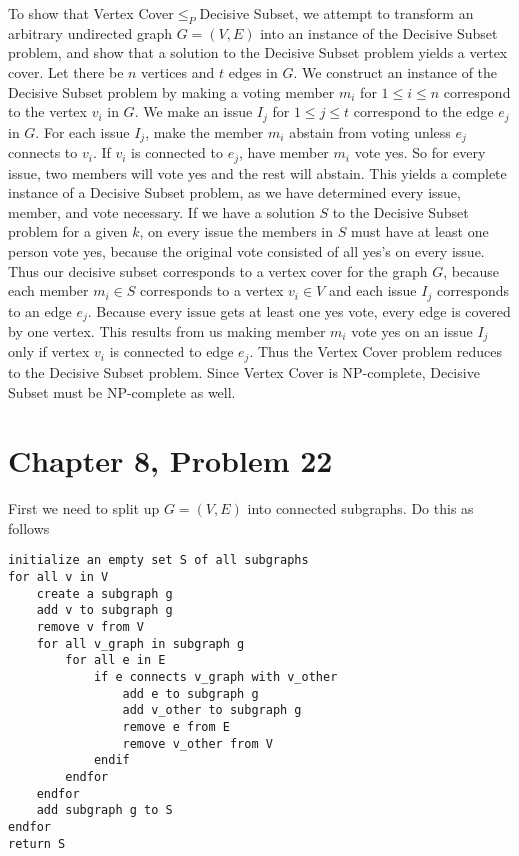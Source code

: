 \documentclass[12pt]{article}
\begin{document}
To show that Vertex Cover\(\leq_P\)Decisive Subset, we attempt to transform an arbitrary undirected graph \(G=(V,E)\) into an instance of the
Decisive Subset problem, and show that a solution to the Decisive Subset problem yields a vertex cover. Let there be \(n\) vertices
and \(t\) edges in \(G\). We construct an instance of the Decisive Subset problem by making a voting member \(m_i\) for
\(1\leq i\leq n\) correspond to the vertex \(v_i\) in \(G\). We make an issue \(I_j\) for \(1\leq j\leq t\) correspond to the
edge \(e_j\) in \(G\). For each issue \(I_j\), make the member \(m_i\) abstain from voting unless \(e_j\) connects to \(v_i\). If
\(v_i\) is connected to \(e_j\), have member \(m_i\) vote yes. So for every issue, two members will vote yes and the rest will abstain.
This yields a complete instance of a Decisive Subset problem, as we have determined every issue, member, and vote necessary. If we have a
solution \(S\) to the Decisive Subset problem for a given \(k\), on every issue the members in \(S\) must have at least one person vote yes,
because the original vote consisted of all yes's on every issue. Thus our decisive subset corresponds to a vertex cover for
the graph \(G\), because each member \(m_i\in S\) corresponds to a vertex \(v_i\in V\) and each issue \(I_j\) corresponds to an edge \(e_j\).
Because every issue gets at least one yes vote, every edge is covered by one vertex. This results from us making member \(m_i\) vote yes on an
issue \(I_j\) only if vertex \(v_i\) is connected to edge \(e_j\). Thus the Vertex Cover problem reduces to the Decisive Subset problem. Since
Vertex Cover is NP-complete, Decisive Subset must be NP-complete as well.

\pagebreak

\section*{Chapter 8, Problem 22}

First we need to split up \(G=(V,E)\) into connected subgraphs. Do this as follows

\begin{verbatim}
initialize an empty set S of all subgraphs
for all v in V
    create a subgraph g
    add v to subgraph g
    remove v from V
    for all v_graph in subgraph g
        for all e in E
            if e connects v_graph with v_other
                add e to subgraph g
                add v_other to subgraph g
                remove e from E
                remove v_other from V
            endif
        endfor
    endfor
    add subgraph g to S
endfor
return S
\end{verbatim}
\end{document}
